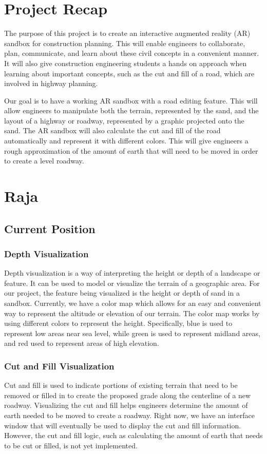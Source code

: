 \documentclass[onecolumn, draftclsnofoot,10pt, compsoc]{IEEEtran}
\begin{document}
\section{Project Recap}
The purpose of this project is to create an interactive augmented reality (AR) sandbox for construction planning.
This will enable engineers to collaborate, plan, communicate, and learn about these civil concepts in a convenient manner.
It will also give construction engineering students a hands on approach when learning about important concepts, such as the cut and fill of a road, which are involved in highway planning.
\par Our goal is to have a working AR sandbox with a road editing feature.
This will allow engineers to manipulate both the terrain, represented by the sand, and the layout of a highway or roadway, represented by a graphic projected onto the sand.
The AR sandbox will also calculate the cut and fill of the road automatically and represent it with different colors. This will give engineers a rough approximation of the amount of earth that will need to be moved in order to create a level roadway.


\section{Raja}

\subsection{Current Position}

\subsubsection{Depth Visualization}
Depth visualization is a way of interpreting the height or depth of a landscape or feature.
It can be used to model or visualize the terrain of a geographic area. For our project, the feature being visualized is the height or depth of sand in a sandbox.
Currently, we have a color map which allows for an easy and convenient way to represent the altitude or elevation of our terrain.
The color map works by using different colors to represent the height.
Specifically, blue is used to represent low areas near sea level, while green is used to represent midland areas, and red used to represent areas of high elevation.

\subsubsection{Cut and Fill Visualization}
Cut and fill is used to indicate portions of existing terrain that need to be removed or filled in to create the proposed grade along the centerline of a new roadway.
Visualizing the cut and fill helps engineers determine the amount of earth needed to be moved to create a roadway.
Right now, we have an interface window that will eventually be used to display the cut and fill information.
However, the cut and fill logic, such as calculating the amount of earth that needs to be cut or filled, is not yet implemented.
\end{document}
